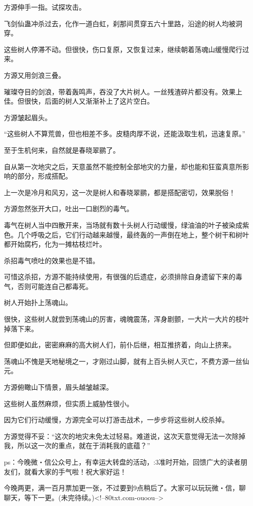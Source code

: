 \begin{this_body}
方源伸手一指。试探攻击。

飞剑仙蛊冲杀过去，化作一道白虹，刹那间贯穿五六十里路，沿途的树人均被洞穿。

这些树人停滞不动。但很快，伤口复原，又恢复过来，继续朝着荡魂山缓慢爬行过来。

方源又用剑浪三叠。

璀璨夺目的剑浪，带着轰鸣声，吞没了大片树人。一丝残渣碎片都没有。效果上佳。但很快，后面的树人又渐渐补上了这片空白。

方源皱起眉头。

“这些树人不算荒兽，但也相差不多。皮糙肉厚不说，还能汲取生机，迅速复原。”

至于生机何来，自然就是春晓翠鹂了。

自从第一次地灾之后，天意虽然不能控制全部地灾的力量，却也能和狂蛮真意所影响的部分，形成搭配。

上一次是冷月和风刃，这一次是树人和春晓翠鹂，都是搭配密切，效果脱俗！

方源忽然张开大口，吐出一口剧烈的毒气。

毒气在树人当中四散开来，当场就有数十头树人行动缓慢，绿油油的叶子被染成紫色。几个呼吸之后，它们行动越来越慢，最终轰的一声倒在地上，整个树干和树叶都开始腐朽，化为一摊枯枝烂叶。

杀招毒气喷吐的效果也是不错。

可惜这杀招，方源不能持续使用，有很强的后遗症，必须排除自身遗留下来的毒气，否则可能连自己都毒死。

树人开始扑上荡魂山。

很快，这些树人就尝到荡魂山的厉害，魂魄震荡，浑身剧颤，一大片一大片的枝叶掉落下来。

但即便如此，密密麻麻的高大树人们，前仆后继，相互推挤着，向山上挤来。

荡魂山不愧是天地秘境之一，才刚过山脚，就有上百头树人灭亡，不费方源一丝仙元。

方源俯瞰山下情景，眉头越皱越深。

这些树人虽然麻烦，但实质上威胁性很小。

因为它们行动缓慢，方源完全可以打游击战术，一步步将这些树人绞杀掉。

方源觉得不妥：“这次的地灾未免太过轻易。难道说，这次天意觉得无法一次除掉我，所以这一次的重点，就在于消耗我的底蕴？”

ps：今晚微・信公众号上，有幸运大转盘的活动，:3准时开始，回馈广大的读者朋友们，就看大家的手气啦！祝大家好运！

今晚两更，满一百月票加更一张，不过要到9点稍后了。大家可以玩玩微・信，聊聊天，等下一更。(未完待续。)<!--80txt.com-ouoou-->

\end{this_body}

